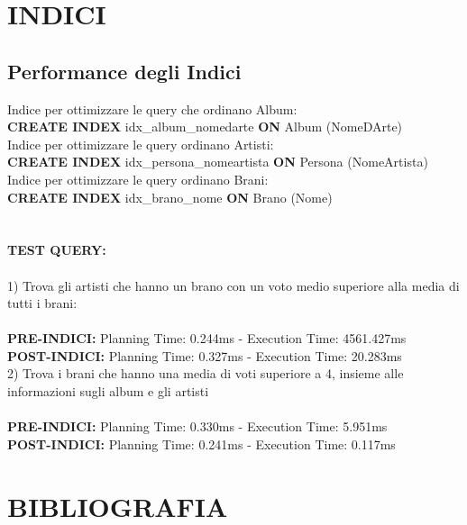 \documentclass{article}
\begin{document}
\newpage
\section{INDICI}
\subsection{Performance degli Indici}

Indice per ottimizzare le query che ordinano Album: \\
\textbf{CREATE INDEX} idx\_album\_nomedarte \textbf{ON} Album (NomeDArte)
\\

Indice per ottimizzare le query ordinano Artisti: \\
\textbf{CREATE INDEX} idx\_persona\_nomeartista \textbf{ON} Persona (NomeArtista)
\\

Indice per ottimizzare le query ordinano Brani: \\
\textbf{CREATE INDEX} idx\_brano\_nome \textbf{ON} Brano (Nome)
\\
\\
\\

\textbf{TEST QUERY:} \\
\\
1) Trova gli artisti che hanno un brano con un voto medio superiore alla media di tutti i brani: \\ \\
\textbf{PRE-INDICI:} Planning Time: 0.244ms - Execution Time: 4561.427ms \\
\textbf{POST-INDICI:} Planning Time: 0.327ms - Execution Time: 20.283ms \\

2) Trova i brani che hanno una media di voti superiore a 4, insieme alle informazioni sugli album e gli artisti \\ \\
\textbf{PRE-INDICI:} Planning Time: 0.330ms - Execution Time: 5.951ms \\
\textbf{POST-INDICI:} Planning Time: 0.241ms - Execution Time: 0.117ms \\

\newpage
\section{BIBLIOGRAFIA}



\end{document}
